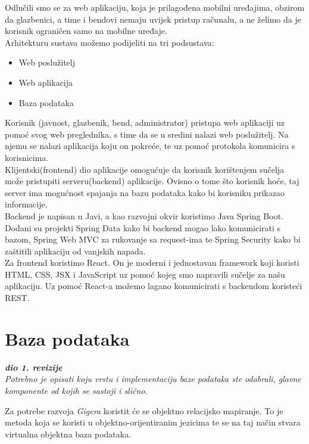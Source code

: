 	Odlučili smo se za web aplikaciju, koja je prilagođena mobilni uređajima, obzirom da glazbenici, a time i bendovi nemaju uvijek pristup računalu, a ne želimo da je korisnik ograničen samo na mobilne uređaje.\\

	Arhitekturu sustava možemo podijeliti na tri podsustava:
		\begin{itemize}
			\item Web poslužitelj
    			\item Web aplikacija
			\item Baza podataka
		\end{itemize}


	Korisnik (javnost, glazbenik, bend, administrator) pristupa web aplikaciji uz pomoć svog web preglednika, s time da se u sredini nalazi web poslužitelj. Na njemu se nalazi aplikacija koju on pokreće, te uz pomoć protokola komunicira s korisnicima.\\

	Klijentski(frontend) dio aplikacije omogućuje da korisnik korištenjem sučelja može pristupiti serveru(backend) aplikacije. Ovisno o tome što korisnik hoće, taj server ima mogućnost spajanja na bazu podataka kako bi korisniku prikazao informacije.\\

	Backend je napisan u Javi, a kao razvojni okvir koristimo Java Spring Boot. Dodani su projekti Spring Data kako bi backend mogao lako komunicirati s bazom, Spring Web MVC za rukovanje sa request-ima te Spring Security kako bi zaštitili aplikaciju od vanjskih napada. \\

	Za frontend koristimo React. On je moderni i jednostavan framework koji koristi HTML, CSS, JSX i JavaScript uz pomoć kojeg smo napravili sučelje za našu aplikaciju. Uz pomoć React-a možemo lagano komunicirati s backendom koristeći REST.\\


		\section{Baza podataka}
			
			\textbf{\textit{dio 1. revizije}}\\
			
		\textit{Potrebno je opisati koju vrstu i implementaciju baze podataka ste odabrali, glavne komponente od kojih se sastoji i slično.}
		
		Za potrebe razvoja \textit{Gigera} koristit će se objektno relacijsko mapiranje. To je metoda koja se koristi u objektno-orijentiranim jezicima te se na taj način stvara virtualna objektna baza podataka.
		
